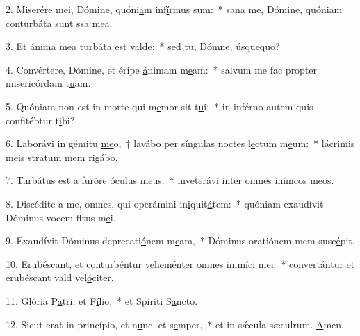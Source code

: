 2. Miserére mei, Dómine, quóni\uline{a}m inf\uline{í}rmus sum:~* sana me, Dómine, quóniam conturbáta sunt ssa m\uline{e}a.\par 
3. Et ánima mea turb\uline{á}ta est v\uline{a}lde:~* sed tu, Dómne, \uline{ú}squequo?\par 
4. Convértere, Dómine, et éripe \uline{á}nimam m\uline{e}am:~* salvum me fac propter misericórdam t\uline{u}am.\par 
5. Quóniam non est in morte qui m\uline{e}mor sit t\uline{u}i:~* in inférno autem quis confitébtur t\uline{i}bi?\par 
6. Laborávi in gémitu \uline{me}o,~† lavábo per síngulas noctes l\uline{e}ctum m\uline{e}um:~* lácrimis meis stratum mem rig\uline{á}bo.\par 
7. Turbátus est a furóre \uline{ó}culus m\uline{e}us:~* inveterávi inter omnes inimcos m\uline{e}os.\par 
8. Discédite a me, omnes, qui operámini in\uline{i}quit\uline{á}tem:~* quóniam exaudívit Dóminus vocem fltus m\uline{e}i.\par 
9. Exaudívit Dóminus deprecati\uline{ó}nem m\uline{e}am,~* Dóminus oratiónem mem susc\uline{é}pit.\par 
10. Erubéscant, et conturbéntur veheménter omnes inim\uline{í}ci m\uline{e}i:~* convertántur et erubéscant vald vel\uline{ó}citer.\par 
11. Glória P\uline{a}tri, et F\uline{í}lio,~* et Spiríti S\uline{a}ncto.\par 
12. Sicut erat in princípio, et n\uline{u}nc, et s\uline{e}mper,~* et in sǽcula sæculrum. \uline{A}men.\par 
